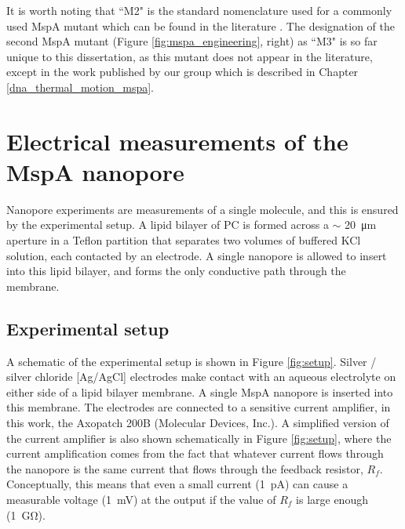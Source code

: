 It is worth noting that ``M2" is the standard nomenclature used for a commonly used MspA mutant which can be found in the literature \citep{Butler2008,Manrao2012,Schreiber2013,Derrington2015}.  The designation of the second MspA mutant (Figure \ref{fig:mspa_engineering}, right) as ``M3" is so far unique to this dissertation, as this mutant does not appear in the literature, except in the work published by our group \citep{Lu2015,Fleming2017} which is described in Chapter \ref{dna_thermal_motion_mspa}.


\section{Electrical measurements of the MspA nanopore}

Nanopore experiments are measurements of a single molecule, and this is ensured by the experimental setup.  A lipid bilayer of PC is formed across a $\sim$ \SI{20}{\um} aperture in a Teflon partition that separates two volumes of buffered KCl solution, each contacted by an electrode.  A single nanopore is allowed to insert into this lipid bilayer, and forms the only conductive path through the membrane.

\subsection{Experimental setup}

A schematic of the experimental setup is shown in Figure \ref{fig:setup}.  Silver / silver chloride [Ag/AgCl] electrodes make contact with an aqueous electrolyte on either side of a lipid bilayer membrane.  A single MspA nanopore is inserted into this membrane.  The electrodes are connected to a sensitive current amplifier, in this work, the Axopatch 200B (Molecular Devices, Inc.).  A simplified version of the current amplifier is also shown schematically in Figure \ref{fig:setup}, where the current amplification comes from the fact that whatever current flows through the nanopore is the same current that flows through the feedback resistor, $R_f$.  Conceptually, this means that even a small current (\SI{1}{\pA}) can cause a measurable voltage (\SI{1}{\mV}) at the output if the value of $R_f$ is large enough (\SI{1}{\giga\ohm}).

